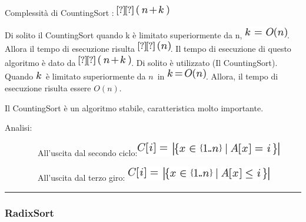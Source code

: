 \documentclass{article}
\begin{document}
{Complessità di CountingSort : }\includegraphics{images/image188.png}


{Di solito il CountingSort quando k è limitato superiormente da n,
}\includegraphics{images/image189.png}{. Allora il tempo di esecuzione
risulta }\includegraphics{images/image190.png}{. }{Il tempo di
esecuzione di questo algoritmo è dato da
}\includegraphics{images/image188.png}{. Di solito è utilizzato (Il
CountingSort). Quando }\includegraphics{images/image118.png}{~è limitato
superiormente da }$n${~in
}\includegraphics{images/image191.png}{. Allora, il tempo di esecuzione
risulta essere }$O(n)${.}

{Il CountingSort è un algoritmo stabile, caratteristica molto
importante.}

{Analisi:}

{~~~~~~~~All'uscita dal secondo
ciclo:}\includegraphics{images/image192.png}

{~~~~~~~~All'uscita dal terzo giro:
}\includegraphics{images/image193.png}



\begin{center}\rule{0.5\linewidth}{\linethickness}\end{center}

\subsubsection{\texorpdfstring{{}}{}}\label{h.f4yzmjxt5mx}

\hypertarget{h.ixohzh3ypk6v}{\subsubsection{\texorpdfstring{{RadixSort}}{RadixSort}}\label{h.ixohzh3ypk6v}}
\end{document}
